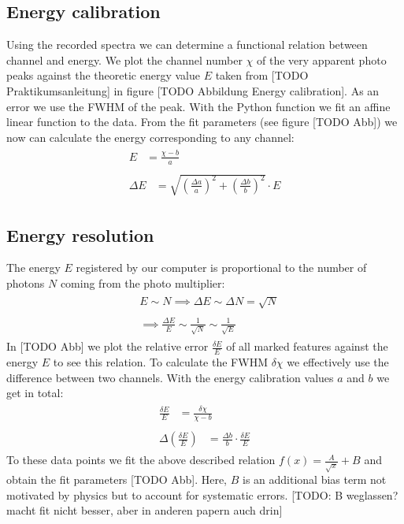\subsection{Energy calibration}
%
Using the recorded spectra we can determine a functional relation between channel and energy.
We plot the channel number $\chi$ of the very apparent photo peaks against the theoretic energy value $E$ taken from [TODO Praktikumsanleitung] in figure [TODO Abbildung Energy calibration].
As an error we use the FWHM of the peak.
With the  Python function we fit an affine linear function to the data.
From the fit parameters (see figure [TODO Abb]) we now can calculate the energy corresponding to any channel:
\begin{align}
    \label{eq:}
    \begin{split}
        E &= \frac{\chi - b}{a}
    \end{split}
    \\
    \label{eq:}
    \begin{split}
        \Delta E &= \sqrt{ \left ( \frac{ \Delta a}{ a } \right ) ^2 + \left ( \frac{\Delta b}{b} \right ) ^2 } \cdot E
    \end{split}
\end{align}
%
\subsection{Energy resolution}
%
The energy $E$ registered by our computer is proportional to the number of photons $N$ coming from the photo multiplier:
\begin{align}
    \label{eq:}
    \begin{split}
        & E \sim N \implies \Delta E \sim \Delta N = \sqrt{N}
    \end{split}
    \\
    \label{eq:}
    \begin{split}
        & \implies \frac{\Delta E}{E} \sim \frac{1}{\sqrt{N}} \sim \frac{1}{\sqrt{E}}
    \end{split}
\end{align}
%
In [TODO Abb] we plot the relative error $\frac{\delta E}{E}$ of all marked features against the energy $E$ to see this relation.
To calculate the FWHM $\delta \chi$ we effectively use the difference between two channels.
With the energy calibration values $a$ and $b$ we get in total:
\begin{align}
    \label{eq:}
    \begin{split}
        \frac{\delta E}{E} &= \frac{ \delta \chi }{\chi - b}
    \end{split}
    \\
    \label{eq:}
    \begin{split}
        \Delta \left ( \frac{\delta E}{E} \right ) &= \frac{ \Delta b }{ b } \cdot \frac{\delta E}{E}
    \end{split}
\end{align}
%
To these data points we fit the above described relation $f(x) = \frac{A}{\sqrt{x}} + B$ and obtain the fit parameters [TODO Abb].
Here, $B$ is an additional bias term not motivated by physics but to account for systematic errors.
[TODO: B weglassen? macht fit nicht besser, aber in anderen papern auch drin]
%
